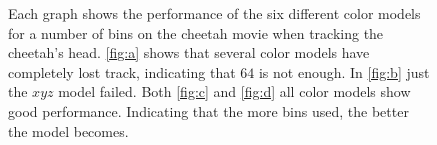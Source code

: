 \documentclass[11pt]{article}
\begin{document}
\begin{figure}[!ht]
{\label{fig:c}
}
\caption{Each graph shows the performance of the six different color models for
a number of bins on the cheetah movie when tracking the cheetah's head.
\ref{fig:a} shows that several color models have completely lost track,
indicating that $64$ is not enough. In \ref{fig:b} just the $xyz$ model failed.
Both \ref{fig:c} and \ref{fig:d} all color models show good performance.
Indicating that the more bins used, the better the model becomes.}
\label{fig:cheetah}
\end{figure}
\end{document}
